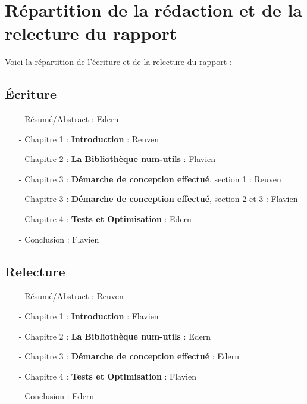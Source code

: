 \chapter{R\'epartition de la r\'edaction et de la relecture du rapport}

Voici la r\'epartition de l'\'ecriture et de la relecture du rapport :
\newline
\section{\'Ecriture}
\begin{itemize}
  \item[-] R\'esum\'e/Abstract : Edern
  \item[-] Chapitre 1 : \textbf{Introduction} : Reuven
  \item[-] Chapitre 2 : \textbf{La Biblioth\`eque num-utils} : Flavien
  \item[-] Chapitre 3 : \textbf{D\'emarche de conception effectu\'e}, section 1 : Reuven
  \item[-] Chapitre 3 : \textbf{D\'emarche de conception effectu\'e}, section 2 et 3 : Flavien
  \item[-] Chapitre 4 : \textbf{Tests et Optimisation} : Edern
  \item[-] Conclusion : Flavien
\newline
\end{itemize}
\section{Relecture}
\begin{itemize}
  \item[-] R\'esum\'e/Abstract : Reuven
  \item[-] Chapitre 1 : \textbf{Introduction} : Flavien
  \item[-] Chapitre 2 : \textbf{La Biblioth\`eque num-utils} : Edern
  \item[-] Chapitre 3 : \textbf{D\'emarche de conception effectu\'e} : Edern
  \item[-] Chapitre 4 : \textbf{Tests et Optimisation} : Flavien
  \item[-] Conclusion : Edern
\end{itemize}
